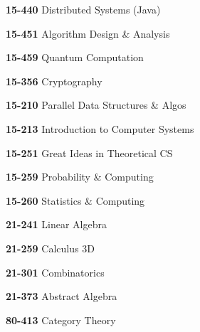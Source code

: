 \begin{cventries}
{\begin{cvitems}
\begin{multicols}{3}
          \item[] {\textbf{15-440} Distributed Systems (Java)}
          \item[] {\textbf{15-451} Algorithm Design \& Analysis}
          \item[] {\textbf{15-459} Quantum Computation}
          \item[] {\textbf{15-356} Cryptography}
          \item[] {\textbf{15-210} Parallel Data Structures \& Algos}
          \item[] {\textbf{15-213} Introduction to Computer Systems}
          \item[] {\textbf{15-251} Great Ideas in Theoretical CS}
          \item[] {\textbf{15-259} Probability \& Computing}
          \item[] {\textbf{15-260} Statistics \& Computing}
          \item[] {\textbf{21-241} Linear Algebra}
          \item[] {\textbf{21-259} Calculus 3D}
          \item[] {\textbf{21-301} Combinatorics}
          \item[] {\textbf{21-373} Abstract Algebra}
          \item[] {\textbf{80-413} Category Theory}
        \end{multicols}
      \end{cvitems}
    }
\end{cventries}
